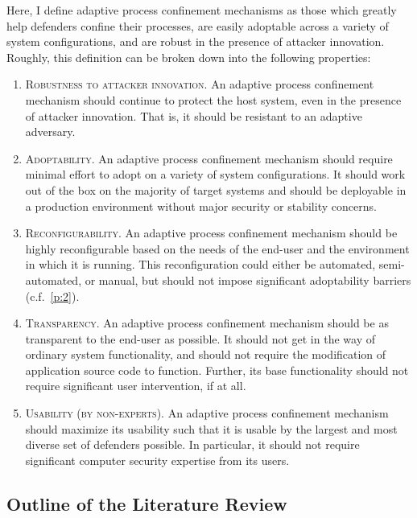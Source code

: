\documentclass[dvipsnames, 12pt]{article}
\begin{document}
Here, I define adaptive process confinement mechanisms as those which greatly
help defenders confine their processes, are easily adoptable across a variety of
system configurations, and are robust in the presence of attacker innovation.
Roughly, this definition can be broken down into the following properties:
\begin{enumerate}[label=\bfseries P\arabic*., ref=P\arabic*, labelindent=2em]
    \item \label{p:1} \textsc{Robustness to attacker innovation.} An adaptive
    process confinement mechanism should continue to protect the host system,
    even in the presence of attacker innovation. That is, it should be resistant
    to an adaptive adversary.

    \item \label{p:2} \textsc{Adoptability.} An adaptive process
    confinement mechanism should require minimal effort to adopt on a variety of
    system configurations. It should work out of the box on the majority of
    target systems and should be deployable in a production environment without
    major security or stability concerns.

    \item \label{p:3} \textsc{Reconfigurability.} An adaptive process
    confinement mechanism should be highly reconfigurable based on the needs of
    the end-user and the environment in which it is running. This
    reconfiguration could either be automated, semi-automated, or manual, but
    should not impose significant adoptability barriers (c.f.~\ref{p:2}).

    \item \label{p:4} \textsc{Transparency.} An adaptive process
    confinement mechanism should be as transparent to the end-user as possible.
    It should not get in the way of ordinary system functionality, and should
    not require the modification of application source code to
    function. Further, its base functionality should not require significant
    user intervention, if at all.

    \item \label{p:5} \textsc{Usability (by non-experts).} An adaptive process
    confinement mechanism should maximize its usability such that it is usable
    by the largest and most diverse set of defenders possible. In particular, it
    should not require significant computer security expertise from its users.
\end{enumerate}

\subsection{Outline of the Literature Review}
\end{document}
